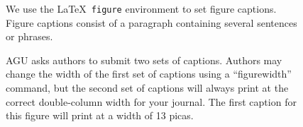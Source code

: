 
\begin{figure}
        \caption{We use the \LaTeX\ {\tt figure} environment 
        to set figure captions.  Figure captions consist of 
        a paragraph containing several sentences or phrases.}
\end{figure}

       \begin{figure}
\figurewidth{13pc}
      \caption{AGU asks authors to submit two sets 
        of captions.  Authors may change the width of 
        the first set of captions using a ``figurewidth'' 
        command, but the second set of captions will 
        always print at the correct double-column width 
        for your journal.  The first caption for this 
        figure will print at a width of 13 picas.}
      \end{figure}


